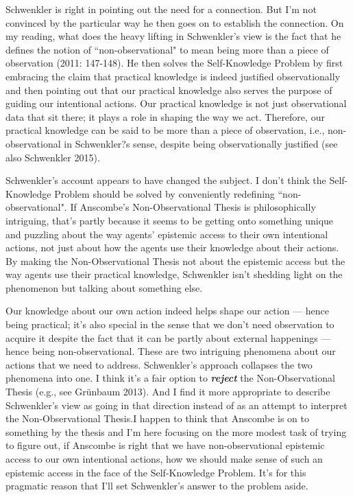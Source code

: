 \documentclass[a4paper,12pt]{article}
\begin{document}
Schwenkler is right in pointing out the need for a connection. But I'm not convinced by the particular way he then goes on to establish the connection. On my reading, what does the heavy lifting in Schwenkler's view is the fact that he defines the notion of ``non-observational" to mean being more than a piece of observation (2011: 147-148). He then solves the Self-Knowledge Problem by first embracing the claim that practical knowledge is indeed justified observationally and then pointing out that our practical knowledge also serves the purpose of guiding our intentional actions. Our practical knowledge is not just observational data that sit there; it plays a role in shaping the way we act. Therefore, our practical knowledge can be said to be more than a piece of observation, i.e., non-observational in Schwenkler?s sense, despite being observationally justified (see also Schwenkler 2015).

Schwenkler's account appears to have changed the subject. I don't think the Self-Knowledge Problem should be solved by conveniently redefining ``non-observational". If Anscombe's Non-Observational Thesis is philosophically intriguing, that's partly because it seems to be getting onto something unique and puzzling about the way agents' epistemic access to their own intentional actions, not just about how the agents use their knowledge about their actions. By making the Non-Observational Thesis not about the epistemic access but the way agents use their practical knowledge, Schwenkler isn't shedding light on the phenomenon but talking about something else.

Our knowledge about our own action indeed helps shape our action --- hence being practical; it's also special in the sense that we don't need observation to acquire it despite the fact that it can be partly about external happenings --- hence being non-observational. These are two intriguing phenomena about our actions that we need to address. Schwenkler's approach collapses the two phenomena into one. I think it's a fair option to \textbf{\emph{reject}} the Non-Observational Thesis (e.g., see Gr\"unbaum 2013). And I find it more appropriate to describe Schwenkler's view as going in that direction instead of as an attempt to interpret the Non-Observational Thesis.\footnotemark I happen to think that Anscombe is on to something by the thesis and I'm here focusing on the more modest task of trying to figure out, if Anscombe is right that we have non-observational epistemic access to our own intentional actions, how we should make sense of such an epistemic access in the face of the Self-Knowledge Problem. It's for this pragmatic reason that I'll set Schwenkler's answer to the problem aside.
\end{document}
